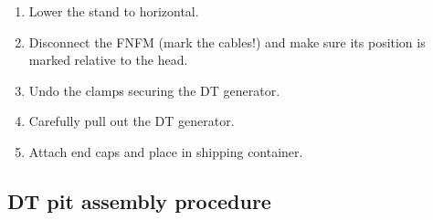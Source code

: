 \documentclass[10pt]{article}
\begin{document}
\begin{enumerate}
\item \CheckBox[name=dtpdp17]{} Lower the stand to horizontal.
\item \CheckBox[name=dtpdp18]{} Disconnect the FNFM (mark the cables!) and make sure its position is marked relative to the head.
\item \CheckBox[name=dtpdp19]{} Undo the clamps securing the DT generator.
\item \CheckBox[name=dtpdp20]{} Carefully pull out the DT generator.
\item \CheckBox[name=dtpdp21]{} Attach end caps and place in shipping container.
\end{enumerate}

\subsection{ DT pit assembly procedure}
\end{document}
